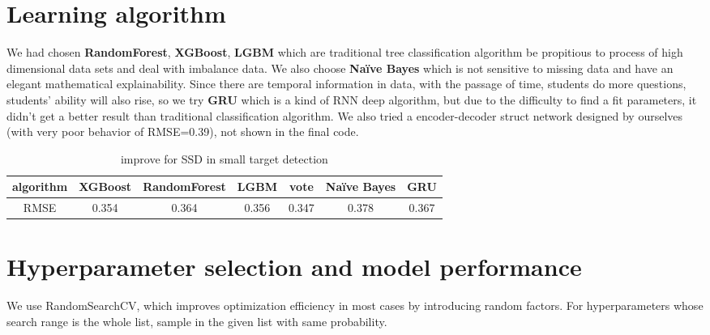\documentclass{article}
\begin{document}
    \section{Learning algorithm}\label{sec:learning-algorithm}
    We had chosen \textbf{RandomForest}, \textbf{XGBoost}, \textbf{LGBM} which are traditional tree classification algorithm be propitious to process of high dimensional data sets and deal with imbalance data.
    We also choose \textbf{Naïve Bayes} which is not sensitive to missing data and have an elegant mathematical explainability.
    Since there are temporal information in data, with the passage of time, students do more questions, students' ability will also rise, so we try \textbf{GRU} which is a kind of RNN deep algorithm, but due to the difficulty to find a fit parameters, it didn't get a better result than traditional classification algorithm.
	We also tried a encoder-decoder struct network designed by ourselves (with very poor behavior of RMSE=0.39), not shown in the final code.
    \begin{table}[htb]
        \centering
        \caption{improve for SSD in small target detection}
        \label{tab:table1}
        \begin{tabular}{|c|c|c|c|c|c|c|}
            \hline
            {algorithm} & {XGBoost} & {RandomForest} & {LGBM}   & {vote}   & {Naïve Bayes} & {GRU}   \\
            \hline

            {RMSE}         & {0.354}  & {0.364}       & {0.356} & {0.347} & {0.378}       & {0.367} \\
            \hline

        \end{tabular}
        \label{performance of each algorithm}
    \end{table}


    \section{Hyperparameter selection and model performance}\label{sec:hyperparameter-selection-and-model-performance}
    We use RandomSearchCV, which improves optimization efficiency in most cases by introducing random factors.
	For hyperparameters whose search range is the whole list, sample in the given list with same probability.
\end{document}
